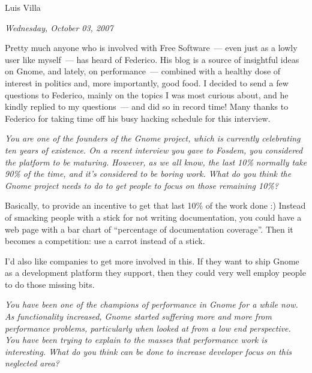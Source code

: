 \documentclass{memoir}
\begin{document}
\begin{epigraphs}
      {Luis Villa}

\end{epigraphs}

\begin{flushright}
  \emph{Wednesday, October 03, 2007}
\end{flushright}

Pretty much anyone who is involved with Free Software~--- even just as
a lowly user like myself~--- has heard of Federico. His blog is a
source of insightful ideas on Gnome, and lately, on performance~---
combined with a healthy dose of interest in politics and, more
importantly, good food. I decided to send a few questions to Federico,
mainly on the topics I was most curious about, and he kindly replied
to my questions~--- and did so in record time! Many thanks to Federico
for taking time off his busy hacking schedule for this interview.

\bigskip

\emph{You are one of the founders of the Gnome project, which is
  currently celebrating ten years of existence. On a recent interview
  you gave to Fosdem, you considered the platform to be
  maturing. However, as we all know, the last 10\% normally take 90\%
  of the time, and it's considered to be boring work. What do you
  think the Gnome project needs to do to get people to focus on those
  remaining 10\%?}

\bigskip

Basically, to provide an incentive to get that last 10\% of the work
done :) Instead of smacking people with a stick for not writing
documentation, you could have a web page with a bar chart of
``percentage of documentation coverage''. Then it becomes a competition:
use a carrot instead of a stick.

I'd also like companies to get more involved in this. If they want to
ship Gnome as a development platform they support, then they could
very well employ people to do those missing bits.

\bigskip

\emph{You have been one of the champions of performance in Gnome for a
while now. As functionality increased, Gnome started suffering more
and more from performance problems, particularly when looked at from a
low end perspective. You have been trying to explain to the masses
that performance work is interesting. What do you think can be done to
increase developer focus on this neglected area?}
\end{document}
